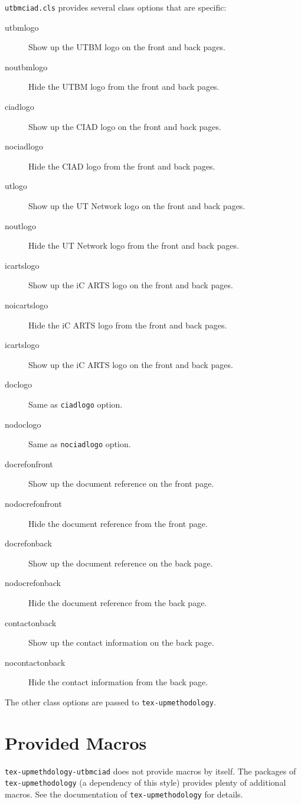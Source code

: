 \documentclass[article]{upmethodology-document}
\begin{document}
\texttt{utbmciad.cls} provides several class options that are specific:
\begin{description}
\item[utbmlogo] Show up the UTBM logo on the front and back pages.
\item[noutbmlogo] Hide the UTBM logo from the front and back pages.
\item[ciadlogo] Show up the CIAD logo on the front and back pages.
\item[nociadlogo] Hide the CIAD logo from the front and back pages.
\item[utlogo] Show up the UT Network logo on the front and back pages.
\item[noutlogo] Hide the UT Network logo from the front and back pages.
\item[icartslogo] Show up the iC ARTS logo on the front and back pages.
\item[noicartslogo] Hide the iC ARTS logo from the front and back pages.
\item[icartslogo] Show up the iC ARTS logo on the front and back pages.
\item[doclogo] Same as \texttt{ciadlogo} option.
\item[nodoclogo] Same as \texttt{nociadlogo} option.
\item[docrefonfront] Show up the document reference on the front page.
\item[nodocrefonfront] Hide the document reference from the front page.
\item[docrefonback] Show up the document reference on the back page.
\item[nodocrefonback] Hide the document reference from the back page.
\item[contactonback] Show up the contact information on the back page.
\item[nocontactonback] Hide the contact information from the back page.
\end{description}

The other class options are passed to \texttt{tex-upmethodology}.

\section{Provided Macros}

\texttt{tex-upmethdology-utbmciad} does not provide macros by itself. The packages of \texttt{tex-upmethodology} (a dependency of this style) provides plenty of additional macros. See the documentation of \texttt{tex-upmethodology} for details.
\end{document}
